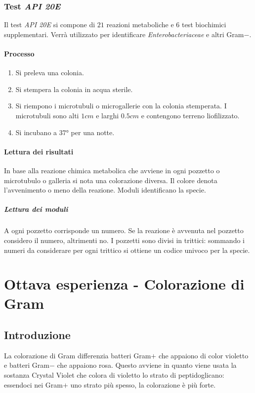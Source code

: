 		\subsubsection{Test \emph{API 20E}}
		Il test \emph{API 20E} si compone di $21$ reazioni metaboliche e $6$ test biochimici supplementari.
		Verr\`a utilizzato per identificare \emph{Enterobacteriaceae} e altri Gram$-$.

			\paragraph{Processo}
			\begin{multicols}{2}
				\begin{enumerate}
					\item Si preleva una colonia.
					\item Si stempera la colonia in acqua sterile.
					\item Si riempono i microtubuli o microgallerie con la colonia stemperata.
						I microtubuli sono alti $1\si{cm}$ e larghi $0.5\si{cm}$ e contengono terreno liofilizzato.
					\item Si incubano a $37\si{\degree}$ per una notte.
				\end{enumerate}
			\end{multicols}

			\paragraph{Lettura dei risultati}
			In base alla reazione chimica metabolica che avviene in ogni pozzetto o microtubulo o galleria si nota una colorazione diversa.
			Il colore denota l'avvenimento o meno della reazione.
			Moduli identificano la specie.

				\subparagraph{Lettura dei moduli}
				A ogni pozzetto corrisponde un numero.
				Se la reazione \`e avvenuta nel pozzetto considero il numero, altrimenti no.
				I pozzetti sono divisi in trittici: sommando i numeri da considerare per ogni trittico si ottiene un codice univoco per la specie.

\section{Ottava esperienza - Colorazione di Gram}
	\subsection{Introduzione}
	La colorazione di Gram differenzia batteri Gram$+$ che appaiono di color violetto e batteri Gram$-$ che appaiono rosa.
	Questo avviene in quanto viene usata la sostanza Crystal Violet che colora di violetto lo strato di peptidoglicano: essendoci nei Gram$+$ uno strato pi\`u spesso, la colorazione \`e pi\`u forte.

